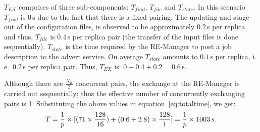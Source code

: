 \documentclass{rspublic}
\newcommand{\jhanote}[1]{ {\textcolor{red} { ***shantenu: #1 }}}
\newcommand{\alnote}[1]{ {\textcolor{blue} { ***andre: #1 }}}
\newcommand{\athotanote}[1]{ {\textcolor{green} { ***athota: #1 }}}
\newcommand{\alnote}[1]{}
\newcommand{\athotanote}[1]{}
\newcommand{\jhanote}[1]{}
\begin{document}




$T_{EX}$ comprises of three sub-components: $T_{find}$, $T_{file}$ and
$T_{state}$. In this scenario $T_{find}$ is $0$\,s due to the fact that there
is a fixed pairing. The updating and stage-out of the configuration
files, is observed to be approximately $0.2$\,s per replica and thus,
$T_{file}$ is $0.4$\,s per replica pair (the transfer of the input files is
done sequentially). 
$T_{state}$ is the time required by the RE-Manager to post a job
description to the advert service. On average $T_{state}$ amounts to
$0.1$\,s per replica, i.\,e.\ $0.2$\,s per replica pair.
Thus, $T_{EX}$ is: $0+0.4+0.2=0.6$\,s. 

Although there are $\frac{N_R}{2}$ concurrent pairs, the exchange 
at the RE-Manager is carried out sequentially; thus the effective 
number of concurrently exchanging pairs is 1. 
Substituting the above values in equation~\ref{eq:totaltime}, we get:
\begin{eqnarray}
  T=  {1 \over p} \times {[ {(71\times {128\over 16}})+ (0.6 + 2.8)\times {128 \over 1}]} = {1 \over p} \times 1003\,s.
  \label{eq:sync}
\end{eqnarray}
\end{document}
